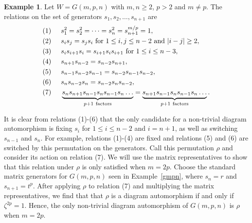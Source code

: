 \documentclass[12pt]{amsart}
\theoremstyle{plain}
\theoremstyle{definition}
\numberwithin{equation}{section}
\newtheorem{example}[theorem]{Example}
\numberwithin{equation}{section}
\begin{document}
	
	\begin{example}
		Let $W=G(m,p,n)$ with $m,n\geq 2$, $p>2$ and $m\neq p$. The relations on the set of generators $s_1,s_2,\dots ,s_{n+1}$ are \begin{align*}
			(1)& \hspace{5mm} s_1^2=s_2^2=\dots=s_n^2=s_{n+1}^{m/p} =1, \\
			(2)& \hspace{5mm} s_{i}s_j=s_js_i \ \text{for} \ 1\leq i,j\leq n-2 \ \text{and} \ |i-j|\geq2, \\
			(3)& \hspace{5mm} s_{i}s_{i+1}s_{i}=s_{i+1}s_is_{i+1} \ \text{for} \ 1\leq i\leq n-3, \\
			(4)& \hspace{5mm} s_{n+1}s_{n-2} =s_{n-2}s_{n+1}, \\
			(5)& \hspace{5mm} s_{n-1}s_{n-2}s_{n-1}=s_{n-2}s_{n-1}s_{n-2}, \\
			(6)& \hspace{5mm} s_{n}s_{n-2}s_{n}=s_{n-2}s_{n}s_{n-2}, \\
			(7)& \hspace{5mm} \underbrace{s_{n}s_{n+1}s_{n-1}s_{n}s_{n-1}s_{n}\dots}_{p+1 \ \text{factors}}=\underbrace{s_{n+1}s_{n-1}s_{n}s_{n-1}s_{n}\dots}_{p+1 \ \text{factors}}.
		\end{align*}
		
		It is clear from relations (1)-(6) that the only candidate for a non-trivial diagram automorphism is fixing $s_i$ for $1\leq i \leq n-2$ and $i=n+1$, as well as switching $s_{n-1}$ and $s_n$. For example, relations (1)-(4) are fixed and relations (5) and (6) are switched by this permutation on the generators. Call this permutation $\rho$ and consider its action on relation (7). We will use the matrix representatives to show that this relation under $\rho$ is only satisfied when $m=2p$. Choose the standard matrix generators for $G(m,p,n)$ seen in Example~\ref{gmpn}, where $s_n=r$ and $s_{n+1}=t^p$. After applying $\rho$ to relation (7) and multiplying the matrix representatives, we find that that $\rho$ is a diagram automorphism if and only if $\zeta^{2p}=1$. Hence, the only non-trivial diagram automorphism of $G(m,p,n)$ is $\rho$ when $m=2p$.
	\end{example}
	
	
	
	
	
\end{document}
